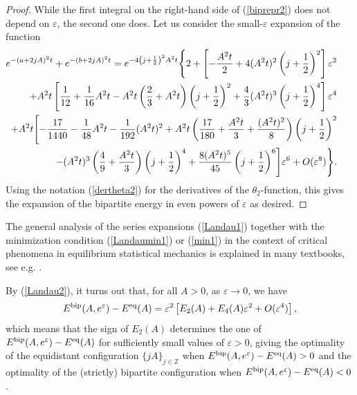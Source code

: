 \documentclass[12pt]{iopart}
\theoremstyle{definition}
\newcommand{\Z}{\mathbb Z}
\begin{document}
\begin{proof}
While the first integral on the right-hand side of (\ref{biprepr2}) does not
depend on $\varepsilon$, the second one does.
Let us consider the small-$\varepsilon$ expansion of the function
\begin{eqnarray}
\hspace{-17pt}
e^{-(a+2jA)^2 t} + e^{-(b+2jA)^2 t} = e^{-4\left(j+\scriptstyle\frac{1}{2}\right)^2A^2 t} 
\Bigg\{ 2 + \left[ - \frac{A^2 t}{2} + 4 (A^2 t)^2
  \left( j + \frac{1}{2} \right)^2 \right] \varepsilon^2 \nonumber \\
\hspace{-17pt}
+ A^2 t \left[ \frac{1}{12} + \frac{1}{16} A^2 t
- A^2 t \left( \frac{2}{3} + A^2 t \right) \left( j + \frac{1}{2} \right)^2 
+ \frac{4}{3} (A^2 t)^3 \left( j + \frac{1}{2} \right)^4 \right]
\varepsilon^4 \nonumber \\ \hspace{-17pt}
+ A^2t \Biggl[ -\frac{17}{1440} - \frac{1}{48}A^2t - \frac{1}{192}(A^2t)^2
+ A^2 t\left( \frac{17}{180}+\frac{A^2t}{3}+\frac{(A^2t)^2}{8}\right)
\left( j+\frac{1}{2}\right)^2 \nonumber\\ \hspace{-17pt}
- (A^2t)^3 \left(\frac{4}{9} + \frac{A^2t}{3} \right)
\left( j+\frac{1}{2}\right)^4
+\frac{8(A^2t)^5}{45}\left( j+\frac{1}{2}\right)^6\Biggr]\varepsilon^6
+ O(\varepsilon^8) \Bigg\} .
\end{eqnarray}
Using the notation (\ref{dertheta2}) for the derivatives of the
$\theta_2$-function, this gives the expansion of the bipartite energy
in even powers of $\varepsilon$ as desired.
\end{proof}

The general analysis of the series expansions (\ref{Landau1}) together
with the minimization condition (\ref{Landaumin1}) or (\ref{min1})
in the context of critical phenomena in equilibrium statistical mechanics
is explained in many textbooks, see e.g. \cite{Landau80,Toledano87}.

By (\ref{Landau2}), it turns out that, for all $A>0$, as $\varepsilon\to 0$,
we have
$$
E^{\rm bip}(A,e^{\varepsilon})-E^{\rm eq}(A)=\varepsilon^2\left[E_2(A)
+E_4(A)\varepsilon^2 + O(\varepsilon^4) \right],
$$
which means that the sign of $E_2(A)$ determines the one of
$E^{\rm bip}(A,e^{\varepsilon})-E^{\rm eq}(A)$ for sufficiently small values
of $\varepsilon>0$, giving the optimality of the equidistant configuration
$\{jA\}_{j\in \Z}$ when $E^{\rm bip}(A,e^{\varepsilon})-E^{\rm eq}(A)>0$ and
the optimality of the (strictly) bipartite configuration when
$E^{\rm bip}(A,e^{\varepsilon})-E^{\rm eq}(A)<0$.
\end{document}
